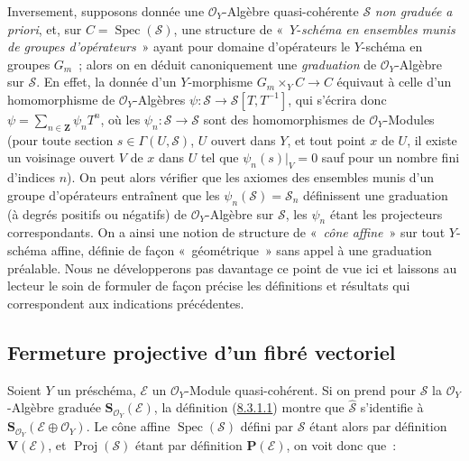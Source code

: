 \begin{remark}[8.3.9]
Inversement, supposons donnée une $\mathcal{O}_Y$-Algèbre quasi-cohérente
$\mathcal{S}$ \emph{non graduée a priori}, et, sur
$C=\operatorname{Spec}(\mathcal{S})$, une structure de «~$Y$-\emph{schéma en
ensembles munis de groupes d'opérateurs}~» ayant pour domaine
d'opérateurs le $Y$-schéma en groupes $G_m$~; alors on en déduit
canoniquement une \emph{graduation} de $\mathcal{O}_Y$-Algèbre sur
$\mathcal{S}$. En effet, la donnée d'un $Y$-morphisme $G_m\times_YC\to C$
équivaut à celle d'un homomorphisme de $\mathcal{O}_Y$-Algèbres
$\psi:\mathcal{S}\to\mathcal{S}[T,T^{-1}]$, qui s'écrira donc
$\psi=\sum_{n\in\mathbf{Z}}\psi_nT^n$, où les
$\psi_n:\mathcal{S}\to\mathcal{S}$ sont des homomorphismes de
$\mathcal{O}_Y$-Modules (pour toute section $s\in\Gamma(U,\mathcal{S})$, $U$ ouvert dans $Y$,
et tout point $x$ de $U$, il existe un voisinage ouvert $V$ de $x$ dans $U$
tel que $\psi_n(s)|_V=0$ sauf pour un nombre fini d'indices $n$). On peut
alors vérifier que les axiomes des ensembles munis d'un groupe d'opérateurs
entraînent que les $\psi_n(\mathcal{S})=\mathcal{S}_n$ définissent une
graduation (à degrés positifs ou négatifs) de $\mathcal{O}_Y$-Algèbre sur
$\mathcal{S}$, les $\psi_n$ étant les projecteurs correspondants. On a ainsi
une notion de structure de «~\emph{cône affine}~» sur tout $Y$-schéma affine,
définie de façon «~géométrique~» sans appel à une graduation préalable.
Nous ne développerons pas davantage ce point de vue ici et laissons au
lecteur le soin de formuler de façon précise les définitions et résultats qui
correspondent aux indications précédentes.
\end{remark}

\subsection{Fermeture projective d'un fibré vectoriel}
\label{subsection:II.8.4-fr}

\begin{env}[8.4.1]
\label{II.8.4.1-fr}
Soient $Y$ un préschéma, $\mathcal{E}$ un $\mathcal{O}_Y$-Module
quasi-cohérent. Si on prend pour $\mathcal{S}$ la $\mathcal{O}_Y$-Algèbre
graduée $\mathbf{S}_{\mathcal{O}_Y}(\mathcal{E})$, la définition
(\hyperref[II.8.3.1.1-fr]{8.3.1.1}) montre que
$\widehat{\mathcal{S}}$ s'identifie à
$\mathbf{S}_{\mathcal{O}_Y}(\mathcal{E}\oplus\mathcal{O}_Y)$. Le cône affine
$\operatorname{Spec}(\mathcal{S})$ défini par $\mathcal{S}$ étant alors par
définition $\mathbf{V}(\mathcal{E})$, et $\operatorname{Proj}(\mathcal{S})$
étant par définition $\mathbf{P}(\mathcal{E})$, on voit donc que~:
\end{env}

